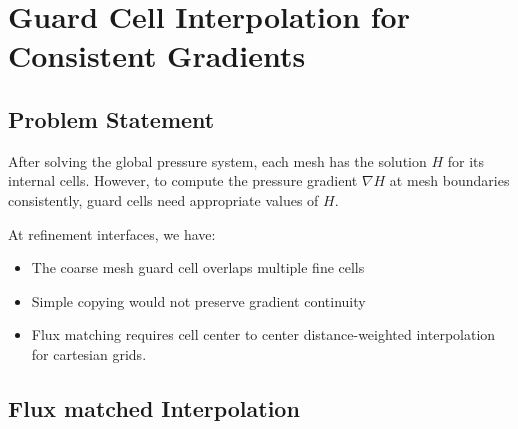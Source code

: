 \section{Guard Cell Interpolation for Consistent Gradients}

\subsection*{Problem Statement}

After solving the global pressure system, each mesh has the solution $H$ for its internal cells. However, to compute the pressure gradient $\nabla H$ at mesh boundaries consistently, guard cells need appropriate values of $H$.

At refinement interfaces, we have:
\begin{itemize}
    \item The coarse mesh guard cell overlaps multiple fine cells
    \item Simple copying would not preserve gradient continuity
    \item Flux matching requires cell center to center distance-weighted interpolation for cartesian grids.
\end{itemize}

\subsection*{Flux matched Interpolation}


